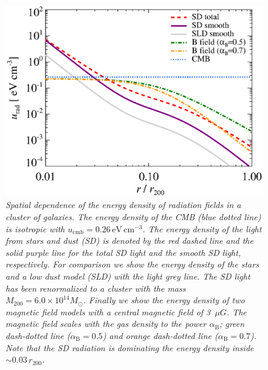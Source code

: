 \documentclass[10pt,aps,pra,reprint,amsmath,amsfonts,amssymb,showpacs,nofootinbib,floatfix]{revtex4-1}
\newcommand{\rmn}{\mathrm}
\newcommand{\msun}{M_\odot}
\newcommand{\rvir}{r_{200}}
\newcommand{\mvir}{M_{200}}
\begin{document}
\begin{figure}%
 \includegraphics[width=0.99\columnwidth]{figures/ucool.eps}
 \caption{\it Spatial dependence of the energy density of radiation
   fields in a cluster of galaxies. The energy density of the CMB
   (blue dotted line) is isotropic with
   $u_\rmn{cmb}=0.26\,\rmn{eV}\,\rmn{cm}^{-3}$. The energy density of
   the light from stars and dust (SD) is denoted by the red dashed
   line and the solid purple line for the total SD light and the
   smooth SD light, respectively. For comparison we show the energy
   density of the stars and a low dust model (SLD) with the light grey
   line. The SD light has been renormalized to a cluster with the mass
   $\mvir=6.0\times10^{14}\msun$. Finally we show the energy density of two
   magnetic field models with a central magnetic field of 3~$\mu
   G$. The magnetic field scales with the gas density to the power
   $\alpha_\rmn{B}$; green dash-dotted line ($\alpha_\rmn{B}=0.5$) and
   orange dash-dotted line ($\alpha_\rmn{B}=0.7$). Note that the SD
   radiation is dominating the energy density inside
   $\sim0.03\,\rvir$.}
 \label{fig:SD_Edens}
\end{figure}
\end{document}
